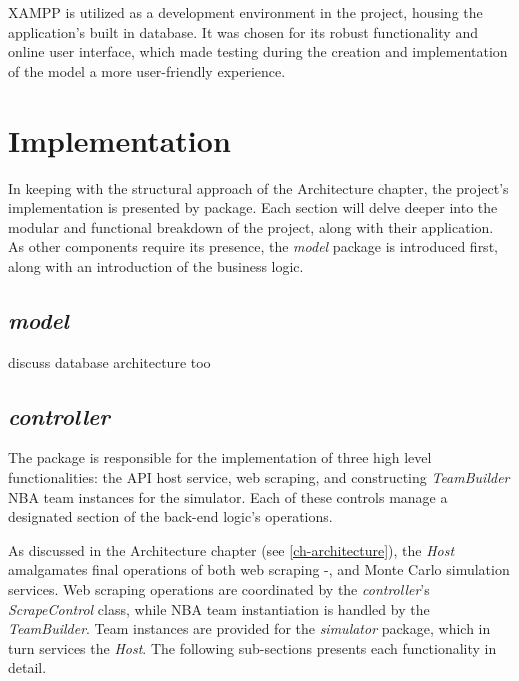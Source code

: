 \documentclass{thesis-ekf}
\theoremstyle{definition}
\theoremstyle{remark}
\begin{document}
XAMPP is utilized as a development environment in the project, housing the application's built in database. It was chosen for its robust functionality and online user interface, which made testing during the creation and implementation of the model a more user-friendly experience. 


\chapter{Implementation}
In keeping with the structural approach of the Architecture chapter, the project's implementation is presented by package. Each section will delve deeper into the modular and functional breakdown of the project, along with their application. As other components require its presence, the \emph{model} package is introduced first, along with an introduction of the business logic.

\section{\emph{model}}
discuss database architecture too

\section{\emph{controller}}
The package is responsible for the implementation of three high level functionalities: the API host service, web scraping, and constructing \emph{TeamBuilder} NBA team instances for the simulator. Each of these controls manage a designated section of the back-end logic's operations. 

As discussed in the Architecture chapter (see \ref{ch-architecture}), the \emph{Host} amalgamates final operations of both web scraping -, and Monte Carlo simulation services. Web scraping operations are coordinated by the \emph{controller}'s \emph{ScrapeControl} class, while NBA team instantiation is handled by the \emph{TeamBuilder}. Team instances are provided for the \emph{simulator} package, which in turn services the \emph{Host}. The following sub-sections presents each functionality in detail.
\end{document}
